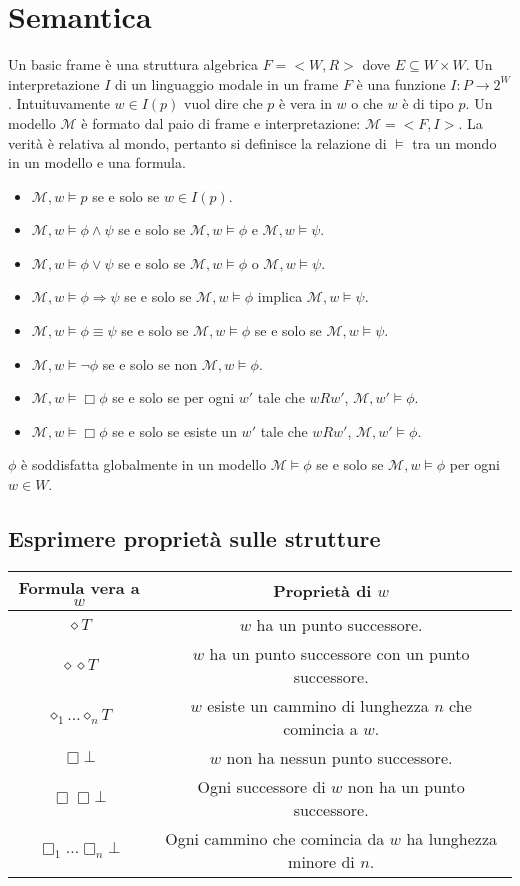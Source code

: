 \section{Semantica}
Un basic frame \`e una struttura algebrica $F=<W, R>$ dove $E\subseteq W\times W$. Un interpretazione $I$ di un linguaggio modale in un frame $F$ \`e una funzione $I:P\rightarrow 2^W$. Intuituvamente
$w\in I(p)$ vuol dire che $p$ \`e vera in $w$ o che $w$ \`e di tipo $p$. Un modello $\mathcal{M}$ \`e formato dal paio di frame e interpretazione: $\mathcal{M}=<F, I>$. La verit\`a \`e relativa al mondo, 
pertanto si definisce la relazione di $\models$ tra un mondo in un modello e una formula.
\begin{itemize}
\item $\mathcal{M}, w\models p$ se e solo se $w\in I(p)$.
\item $\mathcal{M}, w\models \phi\land \psi$ se e solo se $\mathcal{M}, w\models\phi$ e $\mathcal{M}, w\models\psi$.
\item $\mathcal{M}, w\models \phi\lor \psi$ se e solo se $\mathcal{M}, w\models\phi$ o $\mathcal{M}, w\models\psi$.
\item $\mathcal{M}, w\models \phi\Rightarrow \psi$ se e solo se $\mathcal{M}, w\models\phi$ implica $\mathcal{M}, w\models\psi$.
\item $\mathcal{M}, w\models \phi\equiv \psi$ se e solo se $\mathcal{M}, w\models\phi$ se e solo se $\mathcal{M}, w\models\psi$.
\item $\mathcal{M}, w\models \neg\phi$ se e solo se  non $\mathcal{M}, w\models\phi$.
\item $\mathcal{M}, w\models \Box\phi$ se e solo se  per ogni $w'$ tale che $wRw'$,  $\mathcal{M}, w'\models\phi$.
\item $\mathcal{M}, w\models \Box\phi$ se e solo se  esiste un $w'$ tale che $wRw'$,  $\mathcal{M}, w'\models\phi$.
\end{itemize}
$\phi$ \`e soddisfatta globalmente in un modello $\mathcal{M}\models\phi$ se e solo se $\mathcal{M}, w\models\phi$ per ogni $w\in W$.
\subsection{Esprimere propriet\`a sulle strutture}
\begin{tabular}{|c|c|}
\hline
Formula vera a $w$ & Propriet\`a di $w$\\
\hline
$\diamond T$ & $w$ ha un punto successore.\\
\hline
$\diamond\diamond T$ & $w$ ha un punto successore con un punto successore.\\
\hline
$\diamond_1\dots\diamond_n T$ & $w$ esiste un cammino di lunghezza $n$ che comincia a $w$.\\
\hline
$\Box\bot$ & $w$ non ha nessun punto successore.\\
\hline
$\Box\Box\bot$ & Ogni successore di $w$ non ha un punto successore.\\
\hline
$\Box_1\dots\Box_n\bot$ & Ogni cammino che comincia da $w$ ha lunghezza minore di $n$.\\
 \hline
\end{tabular}

